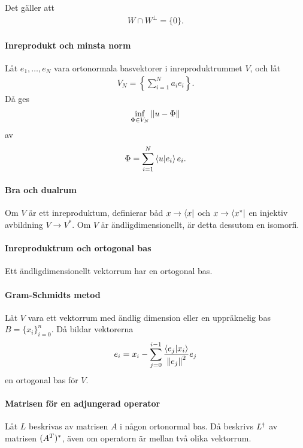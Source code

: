 \proof
Det gäller att
\begin{align*}
	W \cap W^{\perp} = \{0\}.
\end{align*}

\paragraph{Inreprodukt och minsta norm}
Låt $e_{1}, \dots, e_{N}$ vara ortonormala basvektorer i inreproduktrummet $V$, och låt
\begin{align*}
	V_{N} = \left\{\sum\limits_{i = 1}^{N}a_{i}e_{i}\right\}.
\end{align*}
Då ges
\begin{align*}
	\inf\limits_{\Phi\in V_{N}}\norm{u - \Phi}
\end{align*}
av
\begin{align*}
	\Phi = \sum\limits_{i = 1}^{N}\bra{u}\ket{e_{i}}e_{i}.
\end{align*}

\proof

\paragraph{Bra och dualrum}
Om $V$ är ett inreproduktum, definierar båd $x\to\bra{x}$ och $x\to\bra{x^{*}}$ en injektiv avbildning $V\to V^{*}$. Om $V$ är ändligdimensionellt, är detta dessutom en isomorfi.

\proof

\paragraph{Inreproduktrum och ortogonal bas}
Ett ändligdimensionellt vektorrum har en ortogonal bas.

\proof

\paragraph{Gram-Schmidts metod}
Låt $V$ vara ett vektorrum med ändlig dimension eller en uppräknelig bas $B = \{x_{i}\}_{i= 0}^{n}$. Då bildar vektorerna
\begin{align*}
	e_{i} = x_{i} - \sum\limits_{j = 0}^{i - 1}\frac{\bra{e_{j}}\ket{x_{i}}}{\norm{e_{j}}^{2}}e_{j}
\end{align*}
en ortogonal bas för $V$.

\proof

\paragraph{Matrisen för en adjungerad operator}
Låt $L$ beskrivas av matrisen $A$ i någon ortonormal bas. Då beskrivs $L^{\dagger}$ av matrisen $(A^{T})^{*}$, även om operatorn är mellan två olika vektorrum.


